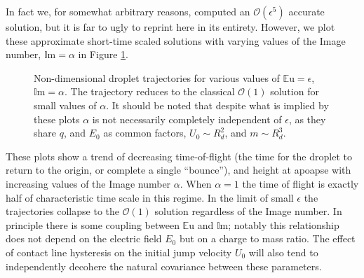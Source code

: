 \documentclass[12pt,a4paper,oneside]{book}
\begin{document}
In fact we, for somewhat arbitrary reasons, computed an $\mathcal{O}(\epsilon^5)$ accurate solution, but it is far to ugly to reprint here in its entirety. However, we plot these approximate short-time scaled solutions with varying values of the Image number, $\mathbb{I}\mbox{m} = \alpha$ in Figure \ref{fig:short_times}.
\begin{figure}[htb]
    \centering
    \resizebox{1\textwidth}{!}{}
    \caption{Non-dimensional droplet trajectories for various values of $\mathbb{E}\mbox{u}=\epsilon$, $\mathbb{I}\mbox{m}=\alpha$. The trajectory reduces to the classical $\mathcal{O}(1)$ solution for small values of $\alpha$. It should be noted that despite what is implied by these plots $\alpha$ is not necessarily completely independent of $\epsilon$, as they share $q$, and $E_0$ as common factors, $U_0 \sim R_d^2$, and $m \sim R_d^3$.}
    \label{fig:short_times}
\end{figure}
These plots show a trend of decreasing time-of-flight (the time for the droplet to return to the origin, or complete a single ``bounce''), and height at apoapse with increasing values of the Image number $\alpha$. When $\alpha = 1$ the time of flight is exactly half of characteristic time scale in this regime. In the limit of small $\epsilon$ the trajectories collapse to the $\mathcal{O}(1)$ solution regardless of the Image number. In principle there is some coupling between $\mathbb{E}\mbox{u}$ and $\mathbb{I}\mbox{m}$; notably this relationship does not depend on the electric field $E_0$ but on a charge to mass ratio. The effect of contact line hysteresis on the initial jump velocity $U_0$ will also tend to independently decohere the natural covariance between these parameters.
\end{document}
